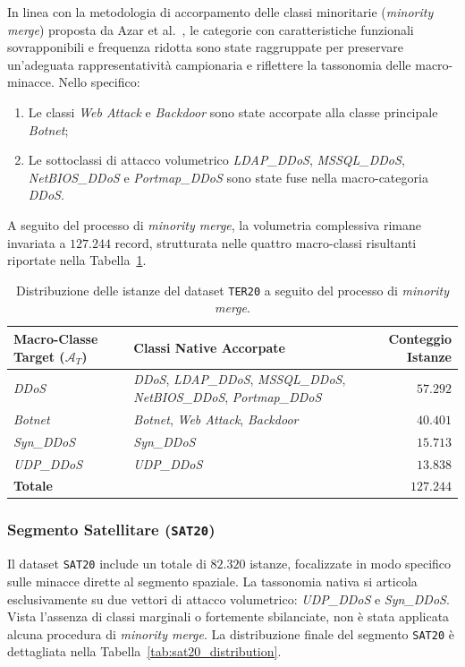 In linea con la metodologia di accorpamento delle classi minoritarie (\textit{minority merge}) proposta da Azar et al.~\cite{azar2023}, le categorie con caratteristiche funzionali sovrapponibili e frequenza ridotta sono state raggruppate per preservare un'adeguata rappresentatività campionaria e riflettere la tassonomia delle macro-minacce. Nello specifico:
\begin{enumerate}
    \item Le classi \textit{Web Attack} e \textit{Backdoor} sono state accorpate alla classe principale \textit{Botnet};
    \item Le sottoclassi di attacco volumetrico \textit{LDAP\_DDoS}, \textit{MSSQL\_DDoS}, \textit{NetBIOS\_DDoS} e \textit{Portmap\_DDoS} sono state fuse nella macro-categoria \textit{DDoS}.
\end{enumerate}

A seguito del processo di \textit{minority merge}, la volumetria complessiva rimane invariata a $127.244$ record, strutturata nelle quattro macro-classi risultanti riportate nella Tabella~\ref{tab:ter20_distribution}.

\begin{table}[H]
    \centering
    \small
    \caption{Distribuzione delle istanze del dataset \texttt{TER20} a seguito del processo di \textit{minority merge}.}
    \label{tab:ter20_distribution}
    \begin{tabular}{l p{6cm} r}
        \toprule
        \textbf{Macro-Classe Target ($\mathcal{A}_T$)} & \textbf{Classi Native Accorpate} & \textbf{Conteggio Istanze} \\
        \midrule
        \textit{DDoS} & \textit{DDoS}, \textit{LDAP\_DDoS}, \textit{MSSQL\_DDoS}, \textit{NetBIOS\_DDoS}, \textit{Portmap\_DDoS} & $57.292$ \\
        \textit{Botnet} & \textit{Botnet}, \textit{Web Attack}, \textit{Backdoor} & $40.401$ \\
        \textit{Syn\_DDoS} & \textit{Syn\_DDoS} & $15.713$ \\
        \textit{UDP\_DDoS} & \textit{UDP\_DDoS} & $13.838$ \\
        \hline
        \textbf{Totale} & & $\mathbf{127.244}$ \\
        \bottomrule
    \end{tabular}
\end{table}

\subsubsection{Segmento Satellitare (\texttt{SAT20})}
Il dataset \texttt{SAT20} include un totale di $82.320$ istanze, focalizzate in modo specifico sulle minacce dirette al segmento spaziale. 
La tassonomia nativa si articola esclusivamente su due vettori di attacco volumetrico: \textit{UDP\_DDoS} e \textit{Syn\_DDoS}. 
Vista l'assenza di classi marginali o fortemente sbilanciate, non è stata applicata alcuna procedura di \textit{minority merge}. 
La distribuzione finale del segmento \texttt{SAT20} è dettagliata nella Tabella~\ref{tab:sat20_distribution}.

